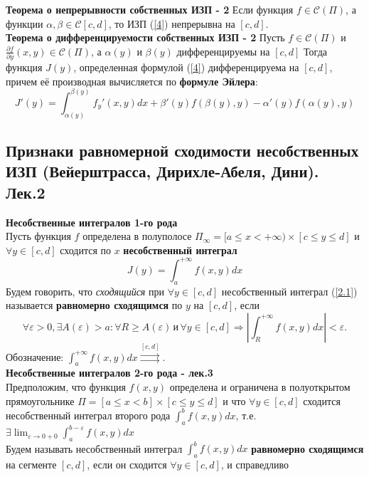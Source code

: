 \documentclass{article}
\begin{document}
	\textbf{Теорема о непрерывности собственных ИЗП - 2} Если функция $f\in \mathcal{C}(\Pi)$, а функции $\alpha,\beta\in \mathcal{C}[c,d]$, то ИЗП (\ref{4}) непрерывна на $[c,d]$.\\
	\textbf{Теорема о дифференцируемости собственных ИЗП - 2} Пусть $f\in \mathcal{C}(\Pi)$ и $\frac{\partial{f}}{\partial{y}}(x,y)\in \mathcal{C}(\Pi)$, а $\alpha(y)$ и $\beta(y)$ дифференцируемы на $[c,d]$ Тогда функция $J(y)$, определенная формулой (\ref{4}) дифференцируема на $[c,d]$, причем её производная вычисляется по \textbf{формуле Эйлера}: 
	\begin{equation}
	\label{5}
	J'(y)=\int_{\alpha(y)}^{\beta(y)} {f}_{y}'(x,y)dx+\beta'(y)f(\beta(y),y)-\alpha'(y)f(\alpha(y),y)
	\end{equation}
\subsection{Признаки равномерной сходимости несобственных ИЗП (Вейерштрасса, Дирихле-Абеля, Дини). Лек.2}
	\textbf{Несобственные интегралов 1-го рода}\\
	Пусть функция $f$ определена в полуполосе ${\Pi}_{\infty}=[a\le x<+\infty)\times[c\le y\le d]$ и $\forall y\in[c,d]$ сходится по $x$ \textbf{несобственный интеграл}
	\begin{equation}
	\label{2.1}
	J(y)=\int_{a}^{+\infty} f(x,y)dx
	\end{equation}
	Будем говорить, что \emph{сходящийся} при $\forall y\in[c,d]$ несобственный интеграл (\ref{2.1}) называется \textbf{равномерно сходящимся} по $y$ на $[c,d]$, если
	\begin{equation}
	\label{2.2}
	\forall \varepsilon>0, \exists A(\varepsilon)>a: \forall R\ge A(\varepsilon)\,\text{и}\,\forall y\in[c,d] \Rightarrow |\int_{R}^{+\infty} f(x,y)dx|<\varepsilon.
	\end{equation}
	Обозначение: $\int_{a}^{+\infty} f(x,y)dx \stackrel{[c,d]}{\rightrightarrows}$.\\
	\textbf{Несобственные интегралов 2-го рода - лек.3}\\
	Предположим, что функция $ f(x, y) $ определена и ограничена в полуоткрытом прямоугольнике $ \Pi=[a \leqslant x<b] \times[c \leqslant y \leqslant d] $ и что $ \forall y \in[c, d] $ сходится несобственный интеграл второго рода $ \int_{a}^{b} f(x, y) d x$, т.е. $\exists \lim _{\varepsilon \rightarrow 0+0} \int_{a}^{b-\varepsilon} f(x, y) d x$\\
	Будем называть несобственный интеграл $ \int_{a}^{b} f(x, y) d x$ \textbf{равномерно сходящимся} на сегменте $ [c, d]$,  если он сходится $ \forall y \in[c, d]$, и справедливо
\end{document}
